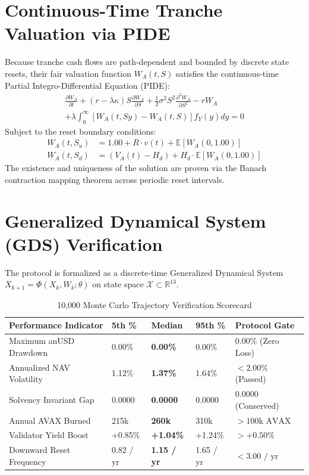 \documentclass[10pt,journal,compsoc]{IEEEtran}
\begin{document}
\section{Continuous-Time Tranche Valuation via PIDE}
Because tranche cash flows are path-dependent and bounded by discrete state resets, their fair valuation function $W_A(t, S)$ satisfies the continuous-time Partial Integro-Differential Equation (PIDE):
\begin{multline}
\frac{\partial W_A}{\partial t} + (r - \lambda \kappa) S \frac{\partial W_A}{\partial S} + \frac{1}{2} \sigma^2 S^2 \frac{\partial^2 W_A}{\partial S^2} - r W_A \\
+ \lambda \int_0^\infty \left[ W_A(t, S y) - W_A(t, S) \right] f_Y(y) dy = 0
\end{multline}
Subject to the reset boundary conditions:
\begin{align}
W_A(t, S_u) &= 1.00 + R \cdot v(t) + \mathbb{E}[W_A(0, 1.00)] \\
W_A(t, S_d) &= (V_A(t) - H_d) + H_d \cdot \mathbb{E}[W_A(0, 1.00)]
\end{align}
The existence and uniqueness of the solution are proven via the Banach contraction mapping theorem across periodic reset intervals.

\section{Generalized Dynamical System (GDS) Verification}
The protocol is formalized as a discrete-time Generalized Dynamical System $X_{k+1} = \Phi(X_k, W_k; \theta)$ on state space $\mathcal{X} \subset \mathbb{R}^{13}$.

\begin{table}[htbp]
\caption{10,000 Monte Carlo Trajectory Verification Scorecard}
\label{tab:kpis}
\centering
\begin{tabularx}{\columnwidth}{lXXXl}
\toprule
\textbf{Performance Indicator} & \textbf{5th \%} & \textbf{Median} & \textbf{95th \%} & \textbf{Protocol Gate} \\
\midrule
Maximum anUSD Drawdown & 0.00\% & \textbf{0.00\%} & 0.00\% & 0.00\% (Zero Loss) \\
Annualized NAV Volatility & 1.12\% & \textbf{1.37\%} & 1.64\% & $< 2.00\%$ (Passed) \\
Solvency Invariant Gap & 0.0000 & \textbf{0.0000} & 0.0000 & 0.0000 (Conserved) \\
Annual AVAX Burned & 215k & \textbf{260k} & 310k & $> 100\text{k AVAX}$ \\
Validator Yield Boost & +0.85\% & \textbf{+1.04\%} & +1.24\% & $> +0.50\%$ \\
Downward Reset Frequency & 0.82 / yr & \textbf{1.15 / yr} & 1.65 / yr & $< 3.00\text{ / yr}$ \\
\bottomrule
\end{tabularx}
\end{table}
\end{document}
